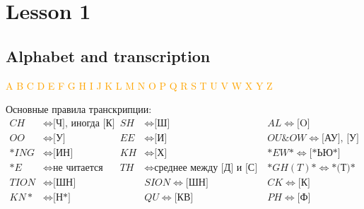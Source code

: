 \documentclass{tstextbook}
\begin{document}
	
	
	\chapter{Lesson 1}
	
	\section{Alphabet and transcription}
	
	\textcolor{orange}{\LARGE A B C D E F G H I J K L M N O P Q R S T U V W X Y Z}
	
	\begin{theorem}[Transcription]
		\label{th:transcription}
		Основные правила транскрипции:
		\begin{align*}
			CH &\Leftrightarrow \text{[Ч], иногда [К]} & SH &\Leftrightarrow \text{[Ш]} && AL \Leftrightarrow \text{[O]}  \\
			OO &\Leftrightarrow \text{[У]} & EE &\Leftrightarrow \text{[И]} && OU \& OW \Leftrightarrow \text{[АУ], [У]} \\
			*ING &\Leftrightarrow \text{[ИН]} &
			KH &\Leftrightarrow \text{[Х]} &&
			*EW* \Leftrightarrow \text{[*ЬЮ*]} \\
			*E &\Leftrightarrow \text{не читается} &
			TH &\Leftrightarrow \text{среднее между [Д] и [С]} &&
			*GH(T)* \Leftrightarrow \text{*(Т)*} \\ 
			TION & \Leftrightarrow \text{[ШН]} && SION \Leftrightarrow \text{[ШН]} && CK \Leftrightarrow \text{[К]} \\
			KN* & \Leftrightarrow \text{[Н*]} && QU \Leftrightarrow \text{[КВ]} && PH \Leftrightarrow \text{[Ф]}
		\end{align*}
	\end{theorem}
\end{document}
